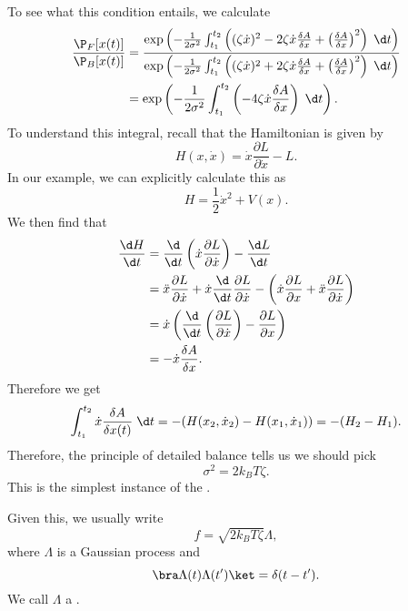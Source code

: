 \documentclass[a4paper]{article}
\begin{document}
To see what this condition entails, we calculate
\begin{align*}
  \frac{\P_F[x(t)]}{\P_B[x(t)]} &= \frac{\exp \left(-\frac{1}{2\sigma^2} \int_{t_1}^{t_2} \left((\zeta \dot{x})^2 - 2 \zeta \dot{x} \frac{\delta A}{\delta x} + \left(\frac{\delta A}{\delta x}\right)^2\right)\;\d t\right)}{\exp \left(-\frac{1}{2\sigma^2} \int_{t_1}^{t_2} \left((\zeta \dot{x})^2 + 2 \zeta \dot{x} \frac{\delta A}{\delta x} + \left(\frac{\delta A}{\delta x}\right)^2\right)\;\d t\right)}\\
  &= \exp \left(-\frac{1}{2\sigma^2} \int_{t_1}^{t_2} \left(-4 \zeta \dot{x} \frac{\delta A}{\delta x}\right)\;\d t\right).
\end{align*}
To understand this integral, recall that the Hamiltonian is given by
\[
  H(x, \dot{x}) = \dot{x} \frac{\partial L}{\partial \dot{x}} - L.
\]
In our example, we can explicitly calculate this as
\[
  H = \frac{1}{2} \dot{x}^2 + V(x).
\]
We then find that
\begin{align*}
  \frac{\d H}{\d t} &= \frac{\d}{\d t} \left(\dot{x} \frac{\partial L}{\partial \dot{x}}\right) - \frac{\d L}{\d t} \\
  &= \ddot{x} \frac{\partial L}{\partial \dot{x}} + \dot{x} \frac{\d}{\d t} \frac{\partial L}{\partial \dot{x}} - \left(\dot{x} \frac{\partial L}{\partial x} + \ddot{x} \frac{\partial L}{\partial \dot{x}}\right)\\
  &= \dot{x}\left(\frac{\d}{\d t} \left(\frac{\partial L}{\partial \dot{x}}\right) - \frac{\partial L}{\partial x}\right)\\
  &= - \dot{x} \frac{\delta A}{\delta x}.
\end{align*}
Therefore we get
\[
  \int_{t_1}^{t_2} \dot{x} \frac{\delta A}{\delta x(t)}\;\d t = - (H(x_2, \dot{x}_2) - H(x_1, \dot{x}_1)) = - (H_2 - H_1).
\]
Therefore, the principle of detailed balance tells us we should pick
\[
  \sigma^2 = 2k_B T \zeta.
\]
This is the simplest instance of the .

Given this, we usually write
\[
  f = \sqrt{2k_B T \zeta} \Lambda,
\]
where $\Lambda$ is a Gaussian process and
\[
  \bra \Lambda(t) \Lambda(t')\ket = \delta(t - t').
\]
We call $\Lambda$ a .

%
\end{document}
